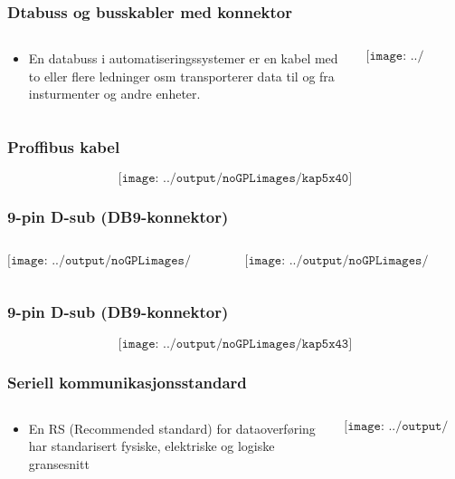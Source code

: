 \documentclass[aspectratio=169,xcolor=dvipsnames]{beamer}
\begin{document}
\begin{frame}
	\frametitle{Dtabuss og busskabler med konnektor}
	\begin{columns}
		\begin{column}{0.5\textwidth}

			\begin{itemize}
				\item En databuss i automatiseringssystemer er en kabel med to eller flere ledninger osm transporterer data til og fra insturmenter og andre enheter. 
			
			\end{itemize}

			
		\end{column}

		\begin{column}{0.5\textwidth}
	$$\texttt{[image: ../output/noGPLimages/kap5x39]}$$
		\end{column}
	\end{columns}
\end{frame}
\begin{frame}
	\frametitle{Proffibus kabel}
	$$\texttt{[image: ../output/noGPLimages/kap5x40]}$$
\end{frame}
\begin{frame}
	\frametitle{9-pin D-sub (DB9-konnektor)}
	\begin{columns}
		\begin{column}{0.5\textwidth}

	$$\texttt{[image: ../output/noGPLimages/kap5x41]}$$

			
		\end{column}

		\begin{column}{0.5\textwidth}
	$$\texttt{[image: ../output/noGPLimages/kap5x42]}$$
		\end{column}
	\end{columns}
\end{frame}
\begin{frame}
	\frametitle{9-pin D-sub (DB9-konnektor)}
	$$\texttt{[image: ../output/noGPLimages/kap5x43]}$$
\end{frame}
\begin{frame}
	\frametitle{Seriell kommunikasjonsstandard}
	\begin{columns}
		\begin{column}{0.5\textwidth}

			\begin{itemize}
				\item En RS (Recommended standard) for dataoverføring har standarisert fysiske, elektriske og logiske gransesnitt 
			\end{itemize}

			
		\end{column}

		\begin{column}{0.5\textwidth}
	$$\texttt{[image: ../output/noGPLimages/kap5x44]}$$
		\end{column}
	\end{columns}
\end{frame}
\end{document}
